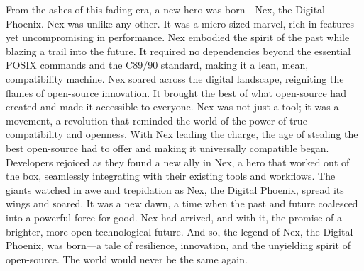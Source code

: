 From the ashes of this fading era, a new hero was born—Nex, the Digital Phoenix.
Nex was unlike any other.
It was a micro-sized marvel, rich in features yet uncompromising in performance.
Nex embodied the spirit of the past while blazing a trail into the future.
It required no dependencies beyond the essential POSIX commands and the C89/90 standard, making it a lean, mean, compatibility machine.
Nex soared across the digital landscape, reigniting the flames of open-source innovation.
It brought the best of what open-source had created and made it accessible to everyone.
Nex was not just a tool; it was a movement, a revolution that reminded the world of the power of true compatibility and openness.
With Nex leading the charge, the age of stealing the best open-source had to offer and making it universally compatible began.
Developers rejoiced as they found a new ally in Nex, a hero that worked out of the box, seamlessly integrating with their existing tools and workflows.
The giants watched in awe and trepidation as Nex, the Digital Phoenix, spread its wings and soared.
It was a new dawn, a time when the past and future coalesced into a powerful force for good.
Nex had arrived, and with it, the promise of a brighter, more open technological future.
And so, the legend of Nex, the Digital Phoenix, was born—a tale of resilience, innovation, and the unyielding spirit of open-source.
The world would never be the same again.
